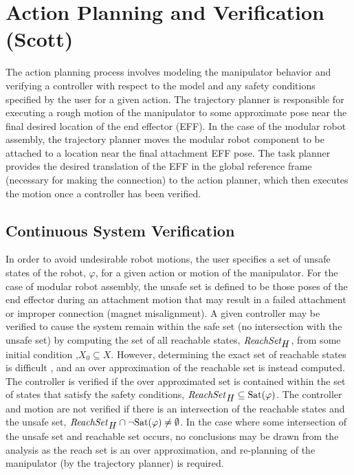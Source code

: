 \section{Action Planning and Verification (Scott)}

The action planning process involves modeling the manipulator behavior and verifying a controller with respect to the model and any safety conditions specified by the user for a given action.
The trajectory planner is responsible for executing a rough motion of the manipulator to some approximate pose near the final desired location of the end effector (EFF).
In the case of the modular robot assembly, the trajectory planner moves the modular robot component to be attached to a location near the final attachment EFF pose.
The task planner provides the desired translation of the EFF in the global reference frame (necessary for making the connection) to the action planner, which then executes the motion once a controller has been verified.


\subsection{Continuous System Verification}
In order to avoid undesirable robot motions, the user specifies a set of unsafe states of the robot, $\varphi$, for a given action or motion of the manipulator.
For the case of modular robot assembly, the unsafe set is defined to be those poses of the end effector during an attachment motion that may result in a failed attachment or improper connection (magnet misalignment).
A given controller may be verified to cause the system remain within the safe set (no intersection with the unsafe set) by computing the set of all reachable states, $\textit{ReachSet}_{\mbox{\textit{H}}}$, from some initial condition ,$X_0 \subseteq X$.
However, determining the exact set of reachable states is difficult \cite{Henzinger:1995:WDH:225058.225162}, and an over approximation of the reachable set is instead computed.
The controller is verified if the over approximated set is contained within the set of states that satisfy the safety conditions, $\mbox{\textit{ReachSet}}_{\mbox{\textit{H}}} \subseteq \mbox{Sat}(\varphi)$.
The controller and motion are not verified if there is an intersection of the reachable states and the unsafe set, $\mbox{\textit{ReachSet}}_{\mbox{\textit{H}}} \cap \neg \mbox{Sat}(\varphi) \neq \emptyset$.
In the case where some intersection of the unsafe set and reachable set occurs, no conclusions may be drawn from the analysis as the reach set is an over approximation, and re-planning of the manipulator (by the trajectory planner) is required.

